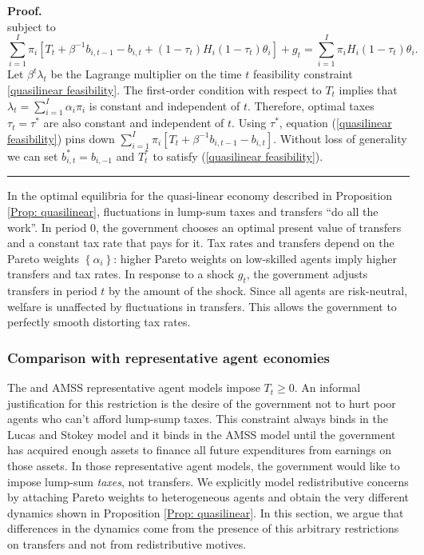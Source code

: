 \documentclass[thmsb,11pt]{article}
\newenvironment{proof}[1][Proof]{\noindent \textbf{#1.} }{\  \rule{0.5em}{0.5em}}
\begin{document}
\begin{proof}
\begin{equation}
\end{equation}%
subject to
\begin{equation}
\sum_{i=1}^{I}\pi _{i}\left[ T_{t}+\beta ^{-1}b_{i,t-1}-b_{i,t}+\left(
1-\tau _{t}\right) H_{i}\left( 1-\tau _{t}\right)\theta_i \right] +g_{t}=%
\sum_{i=1}^{I}\pi _{i}H_{i}\left( 1-\tau _{t}\right)\theta_i .
\label{quasilinear feasibility}
\end{equation}%
Let $\beta ^{t}\lambda _{t}$ be the Lagrange multiplier on the time $t$
feasibility constraint \eqref{quasilinear feasibility}. The first-order condition with respect to $T_{t}$
implies that $\lambda _{t}=\sum_{i=1}^{I}\alpha _{i}\pi _{i}$ is constant
and independent of $t.$ Therefore, optimal taxes $\tau _{t}=\tau^{\ast }$ are
also constant and independent of $t.$  Using $\tau^{\ast}$, equation (\ref{quasilinear feasibility}) pins down $\sum_{i=1}^{I}\pi _{i}\left[ T_{t}+\beta ^{-1}b_{i,t-1}-b_{i,t}\right]$. Without loss of generality we can set $b^*_{i,t}=b_{i,-1}$ and $T^*_t$ to satisfy  (\ref{quasilinear feasibility}). %
\end{proof}

\smallskip In the optimal equilibria for the quasi-linear economy described in Proposition \ref{Prop: quasilinear}, fluctuations in lump-sum taxes and
transfers ``do all the work''. In period 0, the government chooses an optimal
present value of transfers and a constant tax rate that pays for it. Tax rates  and transfers depend on the Pareto weights $\left\{ \alpha
_{i}\right\} $:  higher Pareto weights on low-skilled agents imply
higher transfers and tax rates. In response to a shock $g_{t}$, the
government adjusts transfers in period $t$ by the amount of the shock. Since
all agents are risk-neutral,  welfare is unaffected by
fluctuations in transfers. This allows the government  to  perfectly smooth distorting tax rates.

\smallskip

\subsubsection{Comparison with representative agent economies} \label{sec: comp with AMSS}

The \cite{LucasJr.1983} and AMSS representative agent models
impose $T_{t}\geq 0$. An informal justification for this restriction is the desire of the government  not to hurt poor agents who can't afford lump-sump taxes.  This constraint always binds in the Lucas and Stokey
model and it binds in the AMSS model  until the government has acquired enough
assets to finance all future expenditures from earnings on those assets. In those
representative agent models, the government would like to impose lump-sum \emph{taxes}, not
transfers. We explicitly model redistributive concerns by attaching Pareto weights to heterogeneous agents and obtain the very different dynamics shown in Proposition \ref{Prop: quasilinear}. In this section, we argue that  differences in the dynamics come from the presence of this arbitrary restrictions on transfers and not from redistributive motives.
\end{document}
